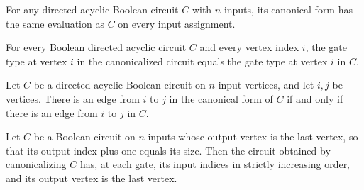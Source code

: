 \begin{lemma}
\label{BoolCircuit.DAGCircuit.eval_canon}
\leanok
{}
For any directed acyclic Boolean circuit $C$ with $n$ inputs, its canonical form has the
same evaluation as $C$ on every input assignment.
\end{lemma}

\begin{lemma}
\label{BoolCircuit.DAGCircuit.vtype_canon}
\leanok
{}
For every Boolean directed acyclic circuit $C$ and every vertex index $i$, the gate type
at vertex $i$ in the canonicalized circuit equals the gate type at vertex $i$ in $C$.
\end{lemma}

\begin{lemma}
\label{BoolCircuit.DAGCircuit.edge_canon}
\leanok
{}
Let $C$ be a directed acyclic Boolean circuit on $n$ input vertices, and let $i,j$ be
vertices. There is an edge from $i$ to $j$ in the canonical form of $C$ if and only if
there is an edge from $i$ to $j$ in $C$.
\end{lemma}

\begin{lemma}
\label{BoolCircuit.DAGCircuit.isCanonical_canon}
\leanok
{}
Let $C$ be a Boolean circuit on $n$ inputs whose output vertex is the last vertex, so
that its output index plus one equals its size. Then the circuit obtained by
canonicalizing $C$ has, at each gate, its input indices in strictly increasing order,
and its output vertex is the last vertex.
\end{lemma}

